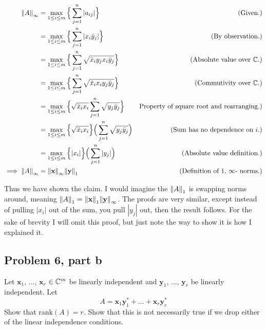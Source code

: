 \begin{solution}
    \alignbreak
    \begin{align}
        \norm{A}_\infty &= \max_{1 \leq i \leq m}\Big\{ \sum_{j = 1}^n |a_{ij}|\Big\} &\text{(Given.)}\nonumber\\
        &= \max_{1 \leq i \leq m}\Big\{ \sum_{j = 1}^n |x_i\Bar{y}_j|\Big\} &\text{(By observation.)}\nonumber\\
        &= \max_{1 \leq i \leq m}\Big\{ \sum_{j = 1}^n \sqrt{\Bar{x}_iy_jx_i\Bar{y}_j}\Big\} &\text{(Absolute value over $\mathbb{C}$.)}\nonumber\\
        &= \max_{1 \leq i \leq m}\Big\{ \sum_{j = 1}^n \sqrt{\Bar{x}_ix_iy_j\Bar{y}_j}\Big\} &\text{(Commutivity over $\mathbb{C}$.)}\nonumber\\
        &= \max_{1 \leq i \leq m}\Big\{ \sqrt{\Bar{x}_ix_i}\sum_{j = 1}^n \sqrt{y_j\Bar{y}_j}\Big\} &\text{Property of square root and rearranging.)}\nonumber\\
        &= \max_{1 \leq i \leq m}\Big\{ \sqrt{\Bar{x}_ix_i}\Big\} \Big(\sum_{j = 1}^n \sqrt{y_j\Bar{y}_j}\Big) &\text{(Sum has no dependence on $i$.)}\nonumber\\
        &= \max_{1 \leq i \leq m}\Big\{ |x_i|\Big\} \Big(\sum_{j = 1}^n |y_j|\Big) &\text{(Absolute value definition.)}\nonumber\\
        \implies \norm{A}_\infty &= \norm{\textbf{x}}_\infty \norm{\textbf{y}}_1 &\text{(Definition of $1$, $\infty$- norms.)}\nonumber
    \end{align}
    \alignbreak

    Thus we have shown the claim. I would imagine the $\norm{A}_1$ is swapping norms around, meaning $\norm{A}_1 = \norm{\textbf{x}}_1\norm{\textbf{y}}_\infty$. The proofs are very similar, except instead of pulling $|x_i|$ out of the sum, you pull $|y_j|$ out, then the result follows. For the sake of brevity I will omit this proof, but just note the way to show it is how I explained it.
\end{solution}

\newpage
\subsection{Problem 6, part b}
Let $\textbf{x}_1$, ..., $\textbf{x}_r$ $\in \mathbb{C}^m$ be linearly independent and $\textbf{y}_1$, ..., $\textbf{y}_r$ be linearly independent. Let 
\[
A = \textbf{x}_1\textbf{y}_1^* + ... + \textbf{x}_r\textbf{y}_r^*
\]
Show that rank$(A) = r$. Show that this is not necessarily true if we drop either of the linear independence conditions.
\partbreak

